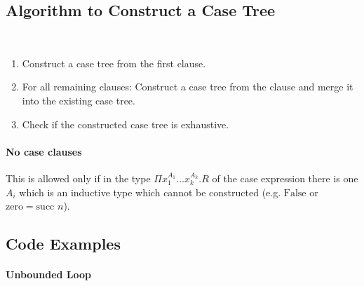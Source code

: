 \subsection{Algorithm to Construct a Case Tree}

\ \begin{enumerate}
    \item Construct a case tree from the first clause.

    \item For all remaining clauses: Construct a case tree from the clause and merge it
        into the existing case tree.

    \item Check if the constructed case tree is exhaustive.
\end{enumerate}

\paragraph{No case clauses} This is allowed only if in the type $\Pi x_1^{A_1}
\ldots x_k^{A_k}. R$ of the case expression there is one $A_i$ which is an
inductive type which cannot be constructed (e.g. $\text{False}$ or $\text{zero}
= \text{succ } n$).





\subsection{Code Examples}



\paragraph{Unbounded Loop}

